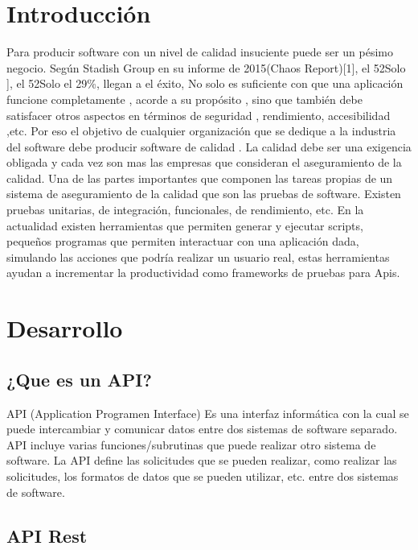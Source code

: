 \documentclass{article}
\begin{document}

\begin{multicols}{2}
\section{Introducción}
Para producir software con un nivel de calidad insuciente puede ser un pésimo negocio.
Según Stadish Group  en  su  informe de  2015(Chaos Report)[1],  el  52Solo   ],  el  52Solo   el  29\%, llegan   a  el  éxito,   No solo  es suficiente con  que  una  aplicación funcione completamente , acorde a  su  propósito  , sino  que también debe satisfacer otros aspectos en términos de  seguridad , rendimiento, accesibilidad ,etc.   Por eso   el  objetivo  de  cualquier   organización  que  se dedique a  la  industria  del  software debe  producir software de  calidad  .  
La calidad  debe ser  una  exigencia  obligada y cada
vez  son  mas  las  empresas que  consideran el 
aseguramiento de la calidad. Una  de  las partes
importantes que  componen las tareas propias de un 
sistema de  aseguramiento de la calidad  que  son  las
pruebas de  software.   Existen  pruebas unitarias,
de  integración, funcionales, de  rendimiento, etc. 
En la actualidad existen herramientas que permiten generar 
y ejecutar scripts, pequeños  programas que  permiten 
interactuar con una aplicación dada, simulando las acciones 
que podría realizar un usuario real, estas herramientas
ayudan a incrementar la productividad como  frameworks 
de pruebas para Apis.

\section{Desarrollo}
\subsection{¿Que es un API?}
API (Application Programen Interface) Es una interfaz informática con la cual se puede intercambiar y comunicar datos entre dos sistemas de software separado. API incluye varias funciones/subrutinas que puede realizar otro sistema de software. La API define las solicitudes que se pueden realizar, como realizar las solicitudes, los formatos de datos que se pueden utilizar, etc. entre dos sistemas de software.

\subsection{API Rest}


\end{multicols}
\end{document}
